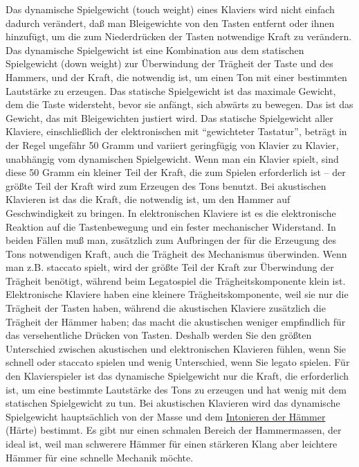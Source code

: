 Das dynamische Spielgewicht (touch weight) eines Klaviers wird nicht einfach dadurch verändert, daß man Bleigewichte von den Tasten entfernt oder ihnen hinzufügt, um die zum Niederdrücken der Tasten notwendige Kraft zu verändern.
Das dynamische Spielgewicht ist eine Kombination aus dem statischen Spielgewicht (down weight) zur Überwindung der Trägheit der Taste und des Hammers, und der Kraft, die notwendig ist, um einen Ton mit einer bestimmten Lautstärke zu erzeugen.
Das statische Spielgewicht ist das maximale Gewicht, dem die Taste widersteht, bevor sie anfängt, sich abwärts zu bewegen.
Das ist das Gewicht, das mit Bleigewichten justiert wird.
Das statische Spielgewicht aller Klaviere, einschließlich der elektronischen mit \enquote{gewichteter Tastatur}, beträgt in der Regel ungefähr 50 Gramm und variiert geringfügig von Klavier zu Klavier, unabhängig vom dynamischen Spielgewicht.
Wenn man ein Klavier spielt, sind diese 50 Gramm ein kleiner Teil der Kraft, die zum Spielen erforderlich ist -- der größte Teil der Kraft wird zum Erzeugen des Tons benutzt.
Bei akustischen Klavieren ist das die Kraft, die notwendig ist, um den Hammer auf Geschwindigkeit zu bringen.
In elektronischen Klaviere ist es die elektronische Reaktion auf die Tastenbewegung und ein fester mechanischer Widerstand.
In beiden Fällen muß man, zusätzlich zum Aufbringen der für die Erzeugung des Tons notwendigen Kraft, auch die Trägheit des Mechanismus überwinden.
Wenn man z.B. staccato spielt, wird der größte Teil der Kraft zur Überwindung der Trägheit benötigt, während beim Legatospiel die Trägheitskomponente klein ist.
Elektronische Klaviere haben eine kleinere Trägheitskomponente, weil sie nur die Trägheit der Tasten haben, während die akustischen Klaviere zusätzlich die Trägheit der Hämmer haben; das macht die akustischen weniger empfindlich für das versehentliche Drücken von Tasten.
Deshalb werden Sie den größten Unterschied zwischen akustischen und elektronischen Klavieren fühlen, wenn Sie schnell oder staccato spielen und wenig Unterschied, wenn Sie legato spielen.
Für den Klavierspieler ist das dynamische Spielgewicht nur die Kraft, die erforderlich ist, um eine bestimmte Lautstärke des Tons zu erzeugen und hat wenig mit dem statischen Spielgewicht zu tun.
Bei akustischen Klavieren wird das dynamische Spielgewicht hauptsächlich von der Masse und dem \hyperref[c2_7_hamm]{Intonieren der Hämmer} (Härte) bestimmt.
Es gibt nur einen schmalen Bereich der Hammermassen, der ideal ist, weil man schwerere Hämmer für einen stärkeren Klang aber leichtere Hämmer für eine schnelle Mechanik möchte.
